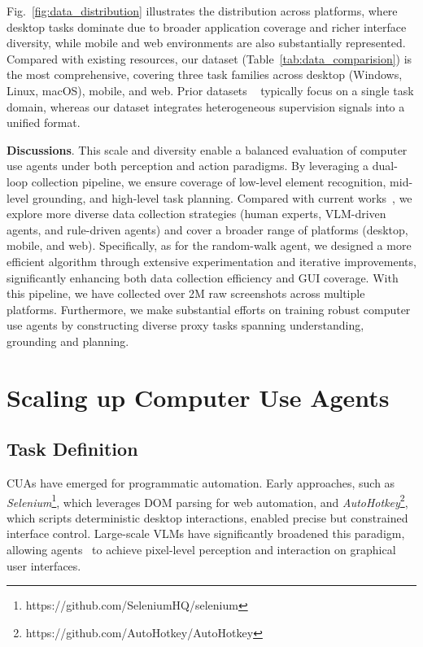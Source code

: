 \documentclass{article} %
\begin{document}
Fig.~\ref{fig:data_distribution} illustrates the distribution across platforms, where desktop tasks dominate due to broader application coverage and richer interface diversity, while mobile and web environments are also substantially represented. Compared with existing resources, our dataset (Table~\ref{tab:data_comparision}) is the most comprehensive, covering three task families across desktop (Windows, Linux, macOS), mobile, and web. Prior datasets ~\citep{deka2017rico,chen2024guicourse,wu2024osatlas} typically focus on a single task domain, whereas our dataset integrates heterogeneous supervision signals into a unified format.  

\textbf{Discussions}. This scale and diversity enable a balanced evaluation of computer use agents under both perception and action paradigms. By leveraging a dual-loop collection pipeline, we ensure coverage of low-level element recognition, mid-level grounding, and high-level task planning. Compared with current works~\citep{sun2024osgenesis,wu2024osatlas,zhang2024aitz,rawles2023androidinthewild}, we explore more diverse data collection strategies (human experts, VLM-driven agents, and rule-driven agents) and cover a broader range of platforms (desktop, mobile, and web). Specifically, as for the random-walk agent, we designed a more efficient algorithm through extensive experimentation and iterative improvements, significantly enhancing both data collection efficiency and GUI coverage. With this pipeline, we have collected over 2M raw screenshots across multiple platforms. 
Furthermore, we make substantial efforts on training robust computer use agents by constructing diverse proxy tasks spanning understanding, grounding and planning. 

\section{Scaling up Computer Use Agents}
\label{sec:method}

\subsection{Task Definition}
CUAs have emerged for programmatic automation. Early approaches, such as \textit{Selenium}\footnote{https://github.com/SeleniumHQ/selenium}, which leverages DOM parsing for web automation, and \textit{AutoHotkey}\footnote{https://github.com/AutoHotkey/AutoHotkey}, which scripts deterministic desktop interactions, enabled precise but constrained interface control. Large-scale VLMs have significantly broadened this paradigm, allowing agents~\citep{cheng2024seeclick,wang2024mobile,zhang2025appagent} to achieve pixel-level perception and interaction on graphical user interfaces.
\end{document}
